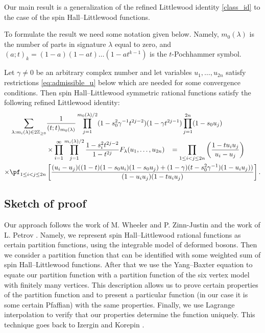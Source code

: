 Our main result is a generalization of the refined Littlewood identity \eqref{class_id} to the case of the spin Hall--Littlewood functions. 

To formulate the result we need some notation given below. Namely, $m_0(\lambda)$ is the number of parts in signature $\lambda$ equal to zero, and 
$(a;t)_k=(1-a)(1-at)\ldots(1-at^{k-1})$ is the $t$-Pochhammer symbol.
\begin{theorem} \label{lit_id} 
	Let $\gamma\ne0$ be an arbitrary complex number and let variables $u_1, \dots, u_{2n}$ satisfy restrictions \eqref{eq:admissible_u} below which are needed for some convergence conditions.
	Then spin Hall--Littlewood symmetric rational functions satisfy the following refined Littlewood identity:
	\begin{equation} \label{littlewood_id}
	\begin{split}
	\sum_{\lambda: m_{i}(\lambda) \in 2 \mathbb{Z}_{\geq 0}} &\frac{1}{( t; t)_{m_{0}(\lambda)}} \prod_{j = 1}^{m_{0}(\lambda) / 2} (1 - s_{0}^2 \gamma^{-1} t^{2j - 2})(1 - \gamma t^{2j-1})  \prod_{j=1}^{2n} (1 - s_0 u_j)		\\&\times
	\prod_{i = 1}^{\infty} \prod_{j = 1}^{m_{i}(\lambda) / 2} \frac{1 - s_{i}^2 t^{2j - 2}}{1 - t^{2j}} F_{\lambda} (u_1, \dots, u_{2n})
	\; \;\;
	= 
	\prod_{1 \leq i<j \leq 2n}
	\left(
	\frac{1-t u_i u_j}{u_i - u_j}
	\right)
	\\\times
	\pf_{1\leq i < j \leq 2n}&
	\left[
	\frac{ (u_i - u_j)((1 - t)(1 - s_0 u_i)(1- s_0 u_j) + (1 - \gamma)(t-s_{0}^{2}\gamma^{-1})(1-u_i u_j))}
	{(1-u_i u_j) (1-t u_i u_j)}
	\right].
	\end{split}
	\end{equation}
\end{theorem}


\subsection{Sketch of proof}
Our approach follows the work of M. Wheeler and P. Zinn-Justin \cite{WZJ16} and the work of L. Petrov \cite{Pet21}. Namely, we represent spin Hall--Littlewood rational functions as certain partition functions, using the integrable model of deformed bosons. 
Then we consider a partition function that can be identified with some weighted sum of spin Hall--Littlewood functions. After that we use the Yang--Baxter equation to equate our partition function with a partition function of the six vertex model with finitely many vertices. This description allows us to prove certain properties of the partition function and to present a particular function (in our case it is some certain Pfaffian) with the same properties.
Finally, we use Lagrange interpolation to verify that our properties determine the function uniquely. This technique goes back to Izergin and Korepin \cite{Ize87,KBI93}.


